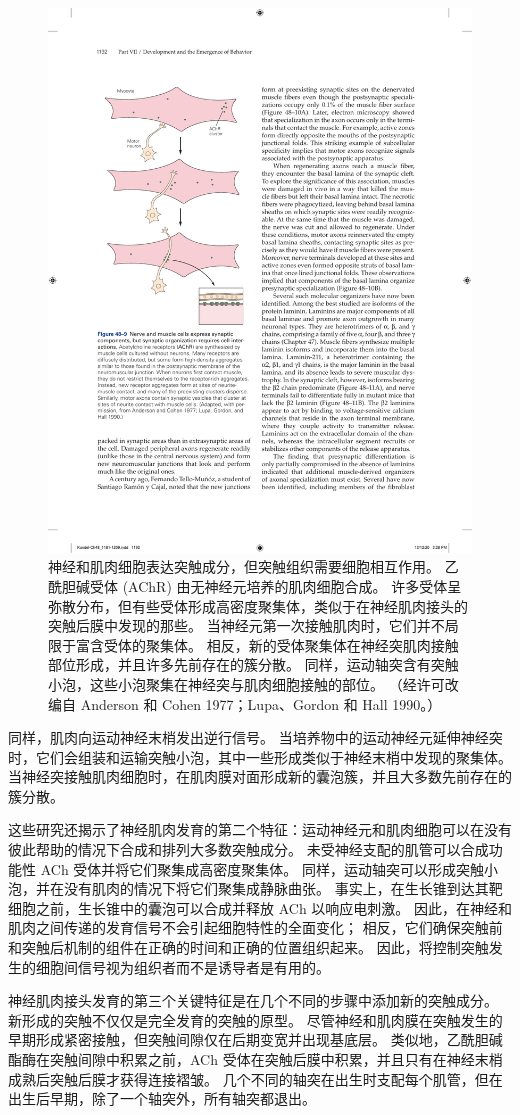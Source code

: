 \begin{figure}[htbp]
	\centering
	\includegraphics[width=0.5\linewidth]{chap48/fig_48_9}
	\caption{神经和肌肉细胞表达突触成分，但突触组织需要细胞相互作用。 乙酰胆碱受体 (AChR) 由无神经元培养的肌肉细胞合成。 许多受体呈弥散分布，但有些受体形成高密度聚集体，类似于在神经肌肉接头的突触后膜中发现的那些。 当神经元第一次接触肌肉时，它们并不局限于富含受体的聚集体。 相反，新的受体聚集体在神经突肌肉接触部位形成，并且许多先前存在的簇分散。 同样，运动轴突含有突触小泡，这些小泡聚集在神经突与肌肉细胞接触的部位。 （经许可改编自 Anderson 和 Cohen 1977；Lupa、Gordon 和 Hall 1990。）}
	\label{fig:48_9}
\end{figure}

同样，肌肉向运动神经末梢发出逆行信号。 当培养物中的运动神经元延伸神经突时，它们会组装和运输突触小泡，其中一些形成类似于神经末梢中发现的聚集体。 当神经突接触肌肉细胞时，在肌肉膜对面形成新的囊泡簇，并且大多数先前存在的簇分散。

这些研究还揭示了神经肌肉发育的第二个特征：运动神经元和肌肉细胞可以在没有彼此帮助的情况下合成和排列大多数突触成分。 未受神经支配的肌管可以合成功能性 ACh 受体并将它们聚集成高密度聚集体。 同样，运动轴突可以形成突触小泡，并在没有肌肉的情况下将它们聚集成静脉曲张。 事实上，在生长锥到达其靶细胞之前，生长锥中的囊泡可以合成并释放 ACh 以响应电刺激。 因此，在神经和肌肉之间传递的发育信号不会引起细胞特性的全面变化； 相反，它们确保突触前和突触后机制的组件在正确的时间和正确的位置组织起来。 因此，将控制突触发生的细胞间信号视为组织者而不是诱导者是有用的。

神经肌肉接头发育的第三个关键特征是在几个不同的步骤中添加新的突触成分。 新形成的突触不仅仅是完全发育的突触的原型。 尽管神经和肌肉膜在突触发生的早期形成紧密接触，但突触间隙仅在后期变宽并出现基底层。 类似地，乙酰胆碱酯酶在突触间隙中积累之前，ACh 受体在突触后膜中积累，并且只有在神经末梢成熟后突触后膜才获得连接褶皱。 几个不同的轴突在出生时支配每个肌管，但在出生后早期，除了一个轴突外，所有轴突都退出。

